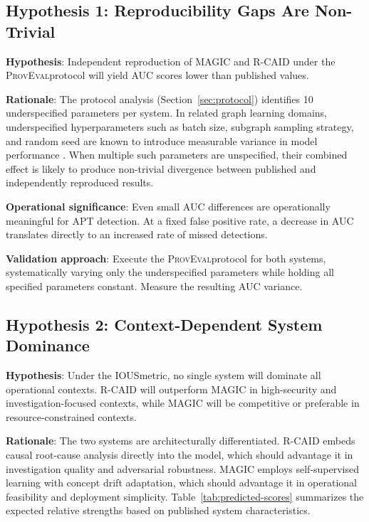 \documentclass[11pt,a4paper]{article}
\newcommand{\ious}{\textsc{IOUS}}
\newcommand{\proveval}{\textsc{ProvEval}}
\begin{document}
\subsection{Hypothesis 1: Reproducibility Gaps Are Non-Trivial}

\textbf{Hypothesis}: Independent reproduction of MAGIC and R-CAID under the \proveval protocol will yield AUC scores lower than published values.

\textbf{Rationale}: The protocol analysis (Section~\ref{sec:protocol}) identifies 10 underspecified parameters per system. In related graph learning domains, underspecified hyperparameters such as batch size, subgraph sampling strategy, and random seed are known to introduce measurable variance in model performance \cite{pineau2021improving}. When multiple such parameters are unspecified, their combined effect is likely to produce non-trivial divergence between published and independently reproduced results.

\textbf{Operational significance}: Even small AUC differences are operationally meaningful for APT detection. At a fixed false positive rate, a decrease in AUC translates directly to an increased rate of missed detections.

\textbf{Validation approach}: Execute the \proveval protocol for both systems, systematically varying only the underspecified parameters while holding all specified parameters constant. Measure the resulting AUC variance.

\subsection{Hypothesis 2: Context-Dependent System Dominance}

\textbf{Hypothesis}: Under the \ious metric, no single system will dominate all operational contexts. R-CAID will outperform MAGIC in high-security and investigation-focused contexts, while MAGIC will be competitive or preferable in resource-constrained contexts.

\textbf{Rationale}: The two systems are architecturally differentiated. R-CAID embeds causal root-cause analysis directly into the model, which should advantage it in investigation quality and adversarial robustness. MAGIC employs self-supervised learning with concept drift adaptation, which should advantage it in operational feasibility and deployment simplicity. Table~\ref{tab:predicted-scores} summarizes the expected relative strengths based on published system characteristics.
\end{document}
